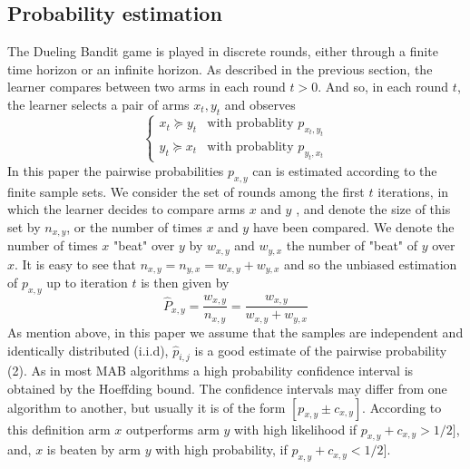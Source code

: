 \documentclass{llncs}
\begin{document}
	\subsection{Probability estimation}		 
		The Dueling Bandit game is played in discrete rounds, either through a finite time horizon or an infinite horizon. 
		 As described in the previous section, the learner compares between two arms in each round $t > 0$. 
		 And so, in each round $t$, the learner selects a pair of arms $x_t,y_t$ and observes
	\begin{equation}
		\begin{cases}
    		x_t \succeq y_t & \text{with probablity } p_{x_t,y_t} 
       	\\
    		y_t \succeq x_t & \text{with probablity } p_{y_t,x_t}
	\end{cases}
	\end{equation}		
	In this paper the pairwise probabilities $p_{x,y}$ can is estimated according to the finite sample sets.
	We consider the set of rounds among the first $t$ iterations, in which the learner decides to compare arms $x$ and $y$ , and denote the size of this set by $n_{x,y}$, or the number of times $x$ and $y$ have been compared.  
	We denote the number of times $x$ "beat" over $y$ by $w_{x,y}$ and $w_{y,x}$ the number of "beat" of $y$ over $x$.
	It is easy to see that $n_{x,y} = n_{y,x} = w_{x,y}+w_{y,x}$ and so the unbiased estimation of $p_{x,y}$ up to iteration $t$ is then given by
	$$ 
		\hat{P}_{x, y} = \frac{w_{x,y}}{n_{x,y}} = 
		\frac{w_{x,y}}{w_{x,y}+w_{y,x}}
	$$
	As mention above, in this paper we assume that the samples are independent and identically distributed (i.i.d), $\hat{p}_{i,j}$ is a good estimate of the pairwise probability (2). 
	As in most MAB algorithms a high probability confidence interval is obtained by the Hoeffding bound. 
	The confidence intervals may differ from one algorithm to another, but usually it is of the form $[p_{x,y} \pm c_{x,y} ]$. 
	According to this definition arm $x$ outperforms arm $y$ with high likelihood if $p_{x,y} + c_{x,y} > 1/2]$, and, $x$ is beaten by arm $y$ with high probability, if $p_{x,y} + c_{x,y} < 1/2]$.
	
\end{document}
